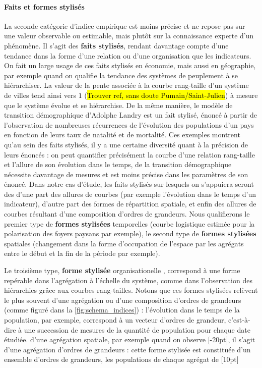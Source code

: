 \paragraph{Faits et formes stylisés}
La seconde catégorie d'indice empirique est moins précise et ne repose pas sur une valeur observable ou estimable, mais plutôt sur la connaissance experte d'un phénomène.
Il s'agit des \og \textbf{faits stylisés}\fg{}\footnotemark{}, rendant davantage compte d'une tendance dans la forme d'une relation ou d'une organisation que les indicateurs.
On fait un large usage de ces faits stylisés en économie, mais aussi en géographie, par exemple quand on qualifie la tendance des systèmes de peuplement à se hiérarchiser.
La valeur de la pente associée à la courbe rang-taille d'un système de villes tend ainsi vers $1$ (\hl{Trouver ref, sans doute Pumain/Saint-Julien}) à mesure que le système évolue et se hiérarchise.
De la même manière, le modèle de transition démographique d'Adolphe Landry est un fait stylisé, énoncé à partir de l'observation de nombreuses récurrences de l'évolution des populations d'un pays en fonction de leurs taux de natalité et de mortalité.
Ces exemples montrent qu'au sein des faits stylisés, il y a une certaine diversité quant à la précision de leurs énoncés :
on peut quantifier précisément la courbe d'une relation rang-taille et l'allure de son évolution dans le temps,  de la transition démographique nécessite davantage de mesures et est moins précise dans les paramètres de son énoncé.
Dans notre cas d'étude, les faits stylisés sur lesquels on s'appuiera seront des d'une part des \og allures\fg{} de courbes (par exemple l'évolution dans le temps d'un indicateur), d'autre part des formes de répartition spatiale, et enfin des \og allures\fg{} de courbes résultant d'une composition d'ordres de grandeurs.
Nous qualifierons le premier type de \og \textbf{formes stylisées} temporelles\fg{} (courbe logistique estimée pour la polarisation des foyers paysans par exemple), le second type de \og \textbf{formes stylisées} spatiales\fg{} (changement dans la forme d'occupation de l'espace par les agrégats entre le début et la fin de la période par exemple).


Le troisième type, \og \textbf{forme stylisée} organisationelle \fg{}, correspond à une forme repérable dans l'agrégation à l'échelle du système, comme dans l'observation des hiérarchies grâce aux courbes rang-tailles.
Notons que ces formes stylisées relèvent le plus souvent d'une agrégation ou d'une composition d'ordres de grandeurs (comme figuré dans la \cref{fig:schema_indices}) :
l'évolution dans le temps de la population, par exemple, correspond à un vecteur d'ordres de grandeur, c'est-à-dire à une succession de mesures de la quantité de population pour chaque date étudiée.
 d'une agrégation spatiale, par exemple quand on observe [-20pt], il s'agit d'une agrégation d'ordres de grandeurs :
cette forme stylisée est constituée d'un ensemble d'ordres de grandeurs, les populations de chaque agrégat de [10pt]

